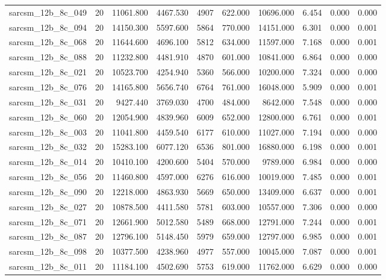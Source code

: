 \begin{tabular}{lrrrrrrrrr}
sarcsm\_12b\_8c\_049 & 20 & 11061.800 & 4467.530 & 4907 & 622.000 & 10696.000 & 6.454 & 0.000 & 0.000 \\
sarcsm\_12b\_8c\_094 & 20 & 14150.300 & 5597.600 & 5864 & 770.000 & 14151.000 & 6.301 & 0.000 & 0.001 \\
sarcsm\_12b\_8c\_068 & 20 & 11644.600 & 4696.100 & 5812 & 634.000 & 11597.000 & 7.168 & 0.000 & 0.001 \\
sarcsm\_12b\_8c\_088 & 20 & 11232.800 & 4481.910 & 4870 & 601.000 & 10841.000 & 6.864 & 0.000 & 0.000 \\
sarcsm\_12b\_8c\_021 & 20 & 10523.700 & 4254.940 & 5360 & 566.000 & 10200.000 & 7.324 & 0.000 & 0.000 \\
sarcsm\_12b\_8c\_076 & 20 & 14165.800 & 5656.740 & 6764 & 761.000 & 16048.000 & 5.909 & 0.000 & 0.001 \\
sarcsm\_12b\_8c\_031 & 20 & 9427.440 & 3769.030 & 4700 & 484.000 & 8642.000 & 7.548 & 0.000 & 0.000 \\
sarcsm\_12b\_8c\_060 & 20 & 12054.900 & 4839.960 & 6009 & 652.000 & 12800.000 & 6.761 & 0.000 & 0.001 \\
sarcsm\_12b\_8c\_003 & 20 & 11041.800 & 4459.540 & 6177 & 610.000 & 11027.000 & 7.194 & 0.000 & 0.000 \\
sarcsm\_12b\_8c\_032 & 20 & 15283.100 & 6077.120 & 6536 & 801.000 & 16880.000 & 6.198 & 0.000 & 0.001 \\
sarcsm\_12b\_8c\_014 & 20 & 10410.100 & 4200.600 & 5404 & 570.000 & 9789.000 & 6.984 & 0.000 & 0.000 \\
sarcsm\_12b\_8c\_056 & 20 & 11460.800 & 4597.000 & 6276 & 616.000 & 10019.000 & 7.485 & 0.000 & 0.001 \\
sarcsm\_12b\_8c\_090 & 20 & 12218.000 & 4863.930 & 5669 & 650.000 & 13409.000 & 6.637 & 0.000 & 0.001 \\
sarcsm\_12b\_8c\_027 & 20 & 10878.500 & 4411.580 & 5781 & 603.000 & 10557.000 & 7.306 & 0.000 & 0.000 \\
sarcsm\_12b\_8c\_071 & 20 & 12661.900 & 5012.580 & 5489 & 668.000 & 12791.000 & 7.244 & 0.000 & 0.001 \\
sarcsm\_12b\_8c\_087 & 20 & 12796.100 & 5148.450 & 5979 & 659.000 & 12797.000 & 6.985 & 0.000 & 0.001 \\
sarcsm\_12b\_8c\_098 & 20 & 10377.500 & 4238.960 & 4977 & 557.000 & 10045.000 & 7.087 & 0.000 & 0.001 \\
sarcsm\_12b\_8c\_011 & 20 & 11184.100 & 4502.690 & 5753 & 619.000 & 11762.000 & 6.629 & 0.000 & 0.000 \\

\end{tabular}
